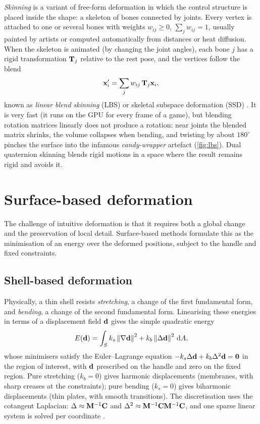 \emph{Skinning} is a variant of free-form deformation in which the control structure is placed
inside the shape: a skeleton of bones connected by joints. Every vertex is attached to one or
several bones with weights $w_{ij}\ge0$, $\sum_jw_{ij}=1$, usually painted by artists or computed
automatically from distances or heat diffusion. When the skeleton is animated (by changing the joint
angles), each bone $j$ has a rigid transformation $\mathbf{T}_j$ relative to the rest pose, and the
vertices follow the blend
\begin{equation}
\mathbf{x}'_i=\sum_jw_{ij}\,\mathbf{T}_j\mathbf{x}_i ,
\end{equation}
known as \emph{linear blend skinning} (LBS) or skeletal subspace deformation (SSD)
\citep{MagnenatThalmann1988}. It is very fast (it runs on the GPU for every frame of a game), but
blending rotation matrices linearly does not produce a rotation: near joints the blended matrix
shrinks, the volume collapses when bending, and twisting by about $180^\circ$ pinches the surface into
the infamous \emph{candy-wrapper} artefact (\cref{fig:lbs}). Dual quaternion skinning
\citep{Kavan2008} blends rigid motions in a space where the result remains rigid and avoids it.


\section{Surface-based deformation}

The challenge of intuitive deformation is that it requires both a global change and the
preservation of local detail. Surface-based methods formulate this as the minimisation of an
energy over the deformed positions, subject to the handle and fixed constraints.

\subsection{Shell-based deformation}

Physically, a thin shell resists \emph{stretching}, a change of the first fundamental form, and
\emph{bending}, a change of the second fundamental form. Linearising these energies in terms of a
displacement field $\mathbf{d}$ gives the simple quadratic energy
\begin{equation}
E(\mathbf{d})=\int_Sk_s\left\lVert \nabla\mathbf{d}\right\rVert^2+k_b\left\lVert \Delta\mathbf{d}\right\rVert^2\,\mathrm{d} A ,
\end{equation}
whose minimisers satisfy the Euler--Lagrange equation $-k_s\Delta\mathbf{d}+k_b\Delta^2\mathbf{d}=\mathbf{0}$ in the region
of interest, with $\mathbf{d}$ prescribed on the handle and zero on the fixed region. Pure stretching
($k_b=0$) gives harmonic displacements (membranes, with sharp creases at the constraints); pure
bending ($k_s=0$) gives biharmonic displacements (thin plates, with smooth transitions). The
discretisation uses the cotangent Laplacian: $\Delta\approx\mathbf{M}^{-1}\mathbf{C}$ and
$\Delta^2\approx\mathbf{M}^{-1}\mathbf{C}\mathbf{M}^{-1}\mathbf{C}$, and one sparse linear system is solved per coordinate
\citep{Botsch2008}.

